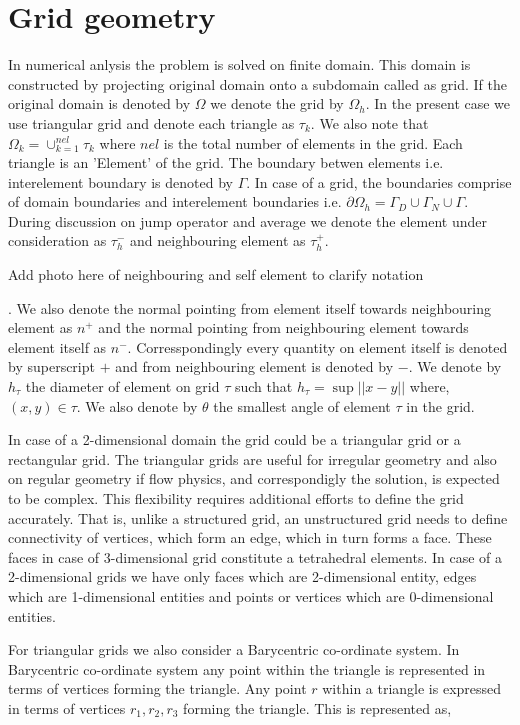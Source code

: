 \documentclass[a4paper,12pt]{book}
\begin{document}
\section{Grid geometry}

In numerical anlysis the problem is solved on finite domain. This domain is constructed by projecting original domain onto a subdomain called as grid. If the original domain is denoted by $\Omega$ we denote the grid by $\Omega_h$. In the present case we use triangular grid and denote each triangle as $\tau_k$. We also note that $\Omega_k = \cup_{k=1}^{nel} \tau_k$ where $nel$ is the total number of elements in the grid. Each triangle is an 'Element' of the grid. The boundary betwen elements i.e. interelement boundary is denoted by $\Gamma$. In case of a grid, the boundaries comprise of domain boundaries and interelement boundaries i.e. $\partial \Omega_h = \Gamma_D \cup \Gamma_N \cup \Gamma$. During discussion on jump operator and average we denote the element under consideration as $\tau_{h}^-$ and neighbouring element as $\tau_{h}^+$. \begin{Huge}
Add photo here of neighbouring and self element to clarify notation
\end{Huge}. We also denote the normal pointing from element itself towards neighbouring element as $n^+$ and the normal pointing from neighbouring element towards element itself as $n^-$. Corresspondingly every quantity on element itself is denoted by superscript $+$ and from neighbouring element is denoted by $-$.  We denote by $h_{\tau}$ the diameter of element on grid $\tau$ such that $h_{\tau} = \sup ||x-y||$ where, $(x,y) \in \tau$. We also denote by $\theta$ the smallest angle of element $\tau$ in the grid.

In case of a 2-dimensional domain the grid could be a triangular grid or a rectangular grid. The triangular grids are useful for irregular geometry and also on regular geometry if flow physics, and correspondigly the solution, is expected to be complex. This flexibility requires additional efforts to define the grid accurately. That is, unlike a structured grid, an unstructured grid needs to define connectivity of vertices, which form an edge, which in turn forms a face. These faces in case of 3-dimensional grid constitute a tetrahedral elements. In case of a 2-dimensional grids we have only faces which are 2-dimensional entity, edges which are 1-dimensional entities and points or vertices which are 0-dimensional entities.

For triangular grids we also consider a Barycentric co-ordinate system. In Barycentric co-ordinate system any point within the triangle is represented in terms of vertices forming the triangle. Any point $r$ within a triangle is expressed in terms of vertices $r_1,r_2,r_3$ forming the triangle. This is represented as,
\end{document}
